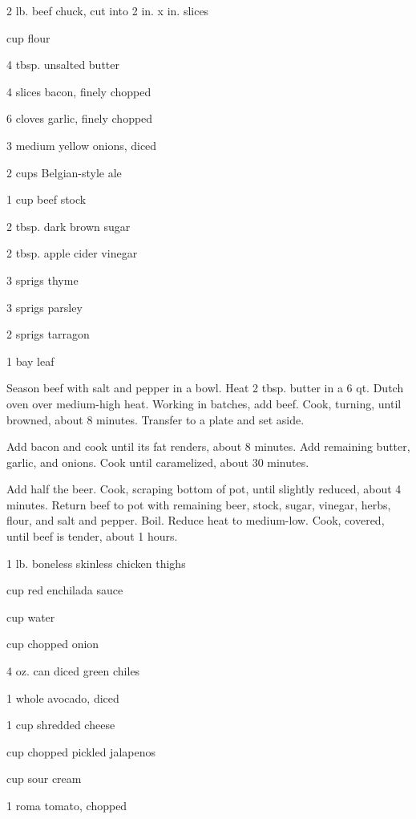 \documentclass{cookbook}
\begin{document}
\tableofcontents


\begin{ingredients}
    \item 2 lb. beef chuck, cut into 2 in. x  in. slices
    \item {} cup flour
    \item 4 tbsp. unsalted butter
    \item 4 slices bacon, finely chopped
    \item 6 cloves garlic, finely chopped
    \item 3 medium yellow onions, diced
    \item 2 cups Belgian-style ale
    \item 1 cup beef stock
    \item 2 tbsp. dark brown sugar
    \item 2 tbsp. apple cider vinegar
    \item 3 sprigs thyme
    \item 3 sprigs parsley
    \item 2 sprigs tarragon
    \item 1 bay leaf
\end{ingredients}

Season beef with salt and pepper in a bowl. Heat 2 tbsp. butter in a 6 qt. Dutch oven over medium-high heat. Working in batches, add beef. Cook, turning, until browned, about 8 minutes. Transfer to a plate and set aside.

Add bacon and cook until its fat renders, about 8 minutes. Add remaining butter, garlic, and onions. Cook until caramelized, about 30 minutes.

Add half the beer. Cook, scraping bottom of pot, until slightly reduced, about 4 minutes. Return beef to pot with remaining beer, stock, sugar, vinegar, herbs, flour, and salt and pepper. Boil. Reduce heat to medium-low. Cook, covered, until beef is tender, about 1  hours.


\begin{ingredients}
    \item 1 lb. boneless skinless chicken thighs
    \item {} cup red enchilada sauce
    \item {} cup water
    \item {} cup chopped onion
    \item 4 oz. can diced green chiles
    \item 1 whole avocado, diced
    \item 1 cup shredded cheese
    \item {} cup chopped pickled jalapenos
    \item {} cup sour cream
    \item 1 roma tomato, chopped
\end{ingredients}
\end{document}
